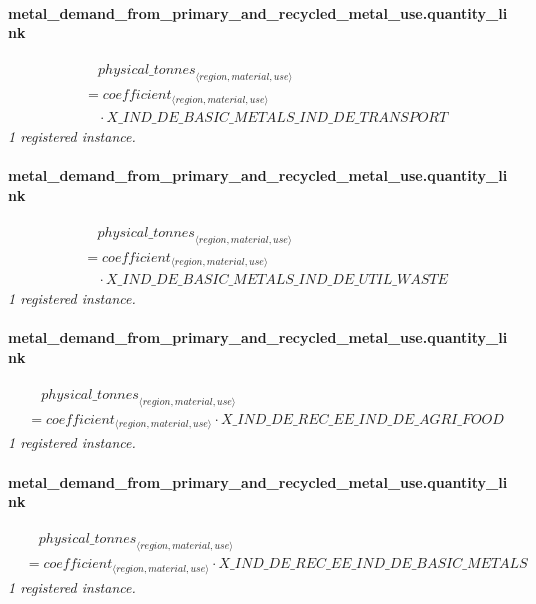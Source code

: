 \documentclass[11pt]{article}
\begin{document}
\paragraph{metal\_demand\_from\_primary\_and\_recycled\_metal\_use.quantity\_link}
\begin{align*}
&\quad {physical\_tonnes}_{\langle region, material, use\rangle}\\
&= coefficient_{\langle region, material, use\rangle}\\
&\quad {}\cdot X\_IND\_DE\_BASIC\_METALS\_IND\_DE\_TRANSPORT
\end{align*}
\noindent\emph{1 registered instance.}\par
\paragraph{metal\_demand\_from\_primary\_and\_recycled\_metal\_use.quantity\_link}
\begin{align*}
&\quad {physical\_tonnes}_{\langle region, material, use\rangle}\\
&= coefficient_{\langle region, material, use\rangle}\\
&\quad {}\cdot X\_IND\_DE\_BASIC\_METALS\_IND\_DE\_UTIL\_WASTE
\end{align*}
\noindent\emph{1 registered instance.}\par
\paragraph{metal\_demand\_from\_primary\_and\_recycled\_metal\_use.quantity\_link}
\begin{align*}
&\quad {physical\_tonnes}_{\langle region, material, use\rangle}\\
&= coefficient_{\langle region, material, use\rangle} \cdot X\_IND\_DE\_REC\_EE\_IND\_DE\_AGRI\_FOOD
\end{align*}
\noindent\emph{1 registered instance.}\par
\paragraph{metal\_demand\_from\_primary\_and\_recycled\_metal\_use.quantity\_link}
\begin{align*}
&\quad {physical\_tonnes}_{\langle region, material, use\rangle}\\
&= coefficient_{\langle region, material, use\rangle} \cdot X\_IND\_DE\_REC\_EE\_IND\_DE\_BASIC\_METALS
\end{align*}
\noindent\emph{1 registered instance.}\par
\end{document}
